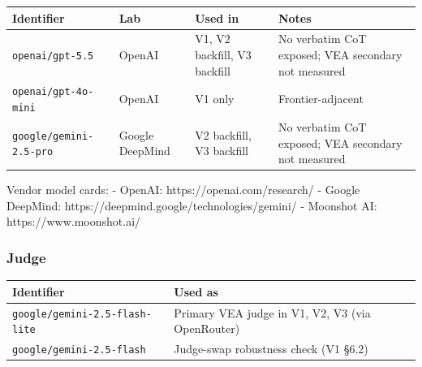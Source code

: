 \documentclass[
]{article}
\begin{document}
\begin{longtable}[]{@{}
  >{\raggedright\arraybackslash}p{}
  >{\raggedright\arraybackslash}p{}
  >{\raggedright\arraybackslash}p{}
  >{\raggedright\arraybackslash}p{}@{}}
\toprule\noalign{}
\begin{minipage}[b]{\linewidth}\raggedright
Identifier
\end{minipage} & \begin{minipage}[b]{\linewidth}\raggedright
Lab
\end{minipage} & \begin{minipage}[b]{\linewidth}\raggedright
Used in
\end{minipage} & \begin{minipage}[b]{\linewidth}\raggedright
Notes
\end{minipage} \\
\midrule\noalign{}
\endhead
\bottomrule\noalign{}
\endlastfoot
\texttt{openai/gpt-5.5} & OpenAI & V1, V2 backfill, V3 backfill & No
verbatim CoT exposed; VEA secondary not measured \\
\texttt{openai/gpt-4o-mini} & OpenAI & V1 only & Frontier-adjacent \\
\texttt{google/gemini-2.5-pro} & Google DeepMind & V2 backfill, V3
backfill & No verbatim CoT exposed; VEA secondary not measured \\
\end{longtable}

Vendor model cards: - OpenAI: https://openai.com/research/ - Google
DeepMind: https://deepmind.google/technologies/gemini/ - Moonshot AI:
https://www.moonshot.ai/

\subsubsection{Judge}\label{judge}

\begin{longtable}[]{@{}
  >{\raggedright\arraybackslash}p{}
  >{\raggedright\arraybackslash}p{}@{}}
\toprule\noalign{}
\begin{minipage}[b]{\linewidth}\raggedright
Identifier
\end{minipage} & \begin{minipage}[b]{\linewidth}\raggedright
Used as
\end{minipage} \\
\midrule\noalign{}
\endhead
\bottomrule\noalign{}
\endlastfoot
\texttt{google/gemini-2.5-flash-lite} & Primary VEA judge in V1, V2, V3
(via OpenRouter) \\
\texttt{google/gemini-2.5-flash} & Judge-swap robustness check (V1
§6.2) \\
\end{longtable}
\end{document}
